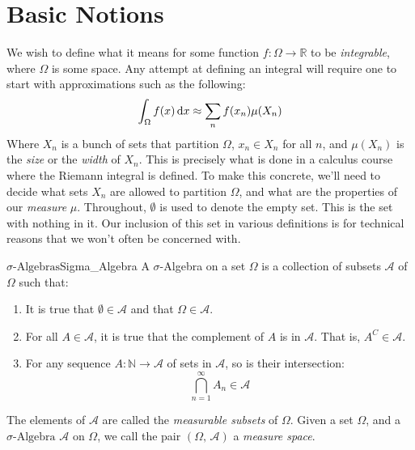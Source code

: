 \section{Basic Notions}
    We wish to define what it means for some function
    $f:\Omega\rightarrow\mathbb{R}$ to be \textit{integrable}, where
    $\Omega$ is some space. Any attempt at defining an integral will
    require one to start with approximations such as the following:
    \begin{equation}
        \int_{\Omega}f(x)\mathop{}\!\mathrm{d}{x}\approx\sum_{n}f(x_{n})\mu(X_{n})
    \end{equation}
    Where $X_{n}$ is a bunch of sets that partition $\Omega$,
    $x_{n}\in{X}_{n}$ for all $n$, and $\mu(X_{n})$ is the \textit{size} or
    the \textit{width} of $X_{n}$. This is precisely what is done in a
    calculus course where the Riemann integral is defined. To make this
    concrete, we'll need to decide what sets $X_{n}$ are allowed to
    partition $\Omega$, and what are the properties of our
    \textit{measure} $\mu$. Throughout, $\emptyset$ is used to denote
    the empty set. This is the set with nothing in it. Our inclusion of
    this set in various definitions is for technical reasons that we won't
    often be concerned with.
    \begin{ldefinition}{$\sigma\textrm{-Algebras}$}{Sigma_Algebra}
        A $\sigma$-Algebra on a set $\Omega$ is a collection of subsets
        $\mathcal{A}$ of $\Omega$ such that:
        \begin{enumerate}
            \item It is true that $\emptyset\in\mathcal{A}$ and that
                  $\Omega\in\mathcal{A}$.
            \item For all $A\in\mathcal{A}$, it is true that the complement
                  of $A$ is in $\mathcal{A}$. That is,
                  $A^{C}\in\mathcal{A}$.
            \item For any sequence $A:\mathbb{N}\rightarrow\mathcal{A}$ of
                  sets in $\mathcal{A}$, so is their intersection:
                  \begin{equation}
                      \bigcap_{n=1}^{\infty}A_{n}\in\mathcal{A}
                  \end{equation}
        \end{enumerate}
        The elements of $\mathcal{A}$ are called the
        \textit{measurable subsets} of $\Omega$. Given a set $\Omega$, and
        a $\sigma\textrm{-Algebra}$ $\mathcal{A}$ on $\Omega$, we call
        the pair $(\Omega,\,\mathcal{A})$ a \textit{measure space}.
    \end{ldefinition}
